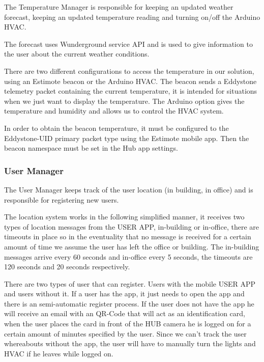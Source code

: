 The Temperature Manager is responsible for keeping an updated weather forecast, keeping an updated temperature reading and turning on/off the Arduino \ac{HVAC}.

The forecast uses Wunderground service API and is used to give information to the user about the current weather conditions.

There are two different configurations to access the temperature in our solution, using an Estimote beacon or the Arduino \ac{HVAC}. 
The beacon sends a Eddystone telemetry packet containing the current temperature, it is intended for situations when we just want to display the temperature.
The Arduino option gives the temperature and humidity and allows us to control the \ac{HVAC} system.


In order to obtain the beacon temperature, it must be configured to the Eddystone-UID primary packet type using the Estimote mobile app. Then the beacon namespace must be set in the Hub app settings.


\subsubsection{User Manager}


The User Manager keeps track of the user location (in building, in office) and is responsible for registering new users.

The location system works in the following simplified manner, it receives two types of location messages from the USER APP, in-building or in-office, there are timeouts in place so in the eventuality that no message is received for a certain amount of time we assume the user has left the office or building. The in-building messages arrive every 60 seconds and in-office every 5 seconds, the timeouts are 120 seconds and 20 seconds respectively.


There are two types of user that can register. Users with the mobile USER APP and users without it. If a user has the app, it just needs to open the app and there is an semi-automatic register process. If the user does not have the app he will receive an email with an QR-Code that will act as an identification card, when the user places the card in front of the HUB camera he is logged on for a certain amount of minutes specified by the user. Since we can't track the user whereabouts without the app, the user will have to manually turn the lights and \ac{HVAC} if he leaves while logged on.



